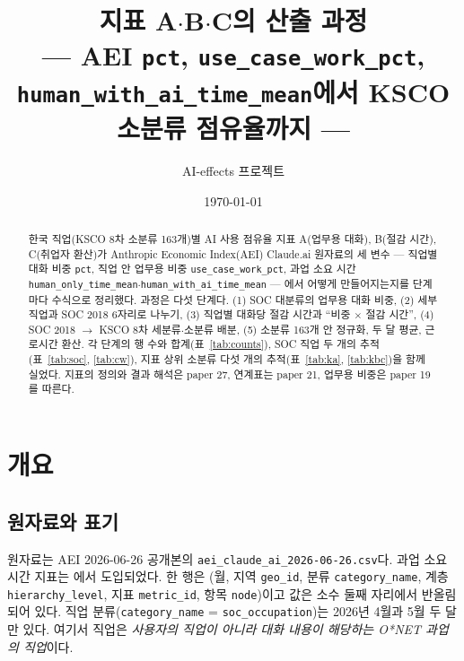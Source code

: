 \documentclass[11pt]{article}
\title{지표 A$\cdot$B$\cdot$C의 산출 과정\\[2mm]
\large --- AEI \texttt{pct}, \texttt{use\_case\_work\_pct}, \texttt{human\_with\_ai\_time\_mean}에서 KSCO 소분류 점유율까지 ---}
\author{AI-effects 프로젝트}
\date{\today}
\begin{document}
\maketitle

\begin{abstract}
\noindent 한국 직업(KSCO 8차 소분류 163개)별 AI 사용 점유율 지표 A(업무용 대화), B(절감 시간), C(취업자 환산)가 Anthropic Economic Index(AEI) Claude.ai 원자료의 세 변수 --- 직업별 대화 비중 \texttt{pct}, 직업 안 업무용 비중 \texttt{use\_case\_work\_pct}, 과업 소요 시간 \texttt{human\_only\_time\_mean}$\cdot$\texttt{human\_with\_ai\_time\_mean} --- 에서 어떻게 만들어지는지를 단계마다 수식으로 정리했다. 과정은 다섯 단계다. (1) SOC 대분류의 업무용 대화 비중, (2) 세부 직업과 SOC 2018 6자리로 나누기, (3) 직업별 대화당 절감 시간과 ``비중 $\times$ 절감 시간'', (4) SOC 2018 $\to$ KSCO 8차 세분류$\cdot$소분류 배분, (5) 소분류 163개 안 정규화, 두 달 평균, 근로시간 환산. 각 단계의 행 수와 합계(표~\ref{tab:counts}), SOC 직업 두 개의 추적(표~\ref{tab:soc}, \ref{tab:cw}), 지표 상위 소분류 다섯 개의 추적(표~\ref{tab:ka}, \ref{tab:kbc})을 함께 실었다. 지표의 정의와 결과 해석은 paper 27, 연계표는 paper 21, 업무용 비중은 paper 19를 따른다.
\end{abstract}

\section{개요}

\subsection{원자료와 표기}

원자료는 AEI 2026-06-26 공개본의 \texttt{aei\_claude\_ai\_2026-06-26.csv}다\parencite{handa-2025-which-economic-tasks-are}. 과업 소요 시간 지표는 \textcite{appel-2026-economic-primitives}에서 도입되었다. 한 행은 (월, 지역 \texttt{geo\_id}, 분류 \texttt{category\_name}, 계층 \texttt{hierarchy\_level}, 지표 \texttt{metric\_id}, 항목 \texttt{node})이고 값은 소수 둘째 자리에서 반올림되어 있다. 직업 분류(\texttt{category\_name} = \texttt{soc\_occupation})는 2026년 4월과 5월 두 달만 있다. 여기서 직업은 \emph{사용자의 직업이 아니라 대화 내용이 해당하는 O*NET 과업의 직업}이다.
\end{document}
